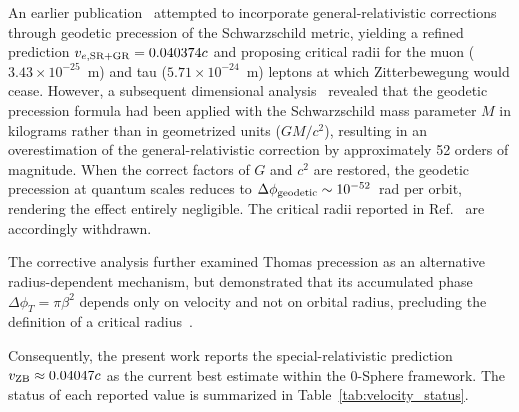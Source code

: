 \documentclass[%
 reprint,
 amsmath,amssymb,
 aps,
 prb,
]{revtex4-2}
\numberwithin{equation}{section}
\begin{document}
An earlier publication~\cite{Hanamura2025SRGR} attempted to incorporate general-relativistic corrections through geodetic precession of the Schwarzschild metric, yielding a refined prediction $v_{e,\rm SR+GR} = 0.040374c$ and proposing critical radii for the muon ($3.43 \times 10^{-25}$~m) and tau ($5.71 \times 10^{-24}$~m) leptons at which Zitterbewegung would cease. However, a subsequent dimensional analysis~\cite{Hanamura2025DimCorr} revealed that the geodetic precession formula had been applied with the Schwarzschild mass parameter $M$ in kilograms rather than in geometrized units ($GM/c^2$), resulting in an overestimation of the general-relativistic correction by approximately 52 orders of magnitude. When the correct factors of $G$ and $c^2$ are restored, the geodetic precession at quantum scales reduces to $\Delta\phi_{\rm geodetic} \sim 10^{-52}$~rad per orbit, rendering the effect entirely negligible. The critical radii reported in Ref.~\cite{Hanamura2025SRGR} are accordingly withdrawn.

The corrective analysis further examined Thomas precession as an alternative radius-dependent mechanism, but demonstrated that its accumulated phase $\Delta\phi_T = \pi\beta^2$ depends only on velocity and not on orbital radius, precluding the definition of a critical radius~\cite{Hanamura2025DimCorr}.

Consequently, the present work reports the special-relativistic prediction $v_{\rm ZB} \approx 0.04047c$ as the current best estimate within the 0-Sphere framework. The status of each reported value is summarized in Table~\ref{tab:velocity_status}.
\end{document}
